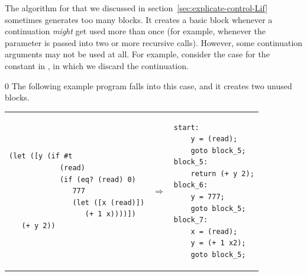 \documentclass[7x10]{TimesAPriori_MIT}%
\def\racketEd{0}
\def\edition{1}
\numberwithin{theorem}{chapter}
\numberwithin{definition}{chapter}
\numberwithin{equation}{chapter}
\begin{document}
The algorithm for  that we discussed in
section~\ref{sec:explicate-control-Lif} sometimes generates too many
blocks. It creates a basic block whenever a continuation \emph{might}
get used more than once (for example, whenever the  parameter is
passed into two or more recursive calls). However, some continuation
arguments may not be used at all. For example, consider the case for
the constant \TRUE{} in , in which we discard the
 continuation.
%
{\if\edition\racketEd
The following example program falls into this
case, and it creates two unused blocks.       
\begin{center}
\begin{tabular}{lll}
\begin{minipage}{0.4\textwidth}
\begin{lstlisting}
(let ([y (if #t
            (read)
            (if (eq? (read) 0)
               777
               (let ([x (read)])
                  (+ 1 x))))])
   (+ y 2))
\end{lstlisting}
\end{minipage}
&
$\Rightarrow$
&
\begin{minipage}{0.55\textwidth}
\begin{lstlisting}
start:
    y = (read);
    goto block_5;
block_5:
    return (+ y 2);
block_6:
    y = 777;
    goto block_5;
block_7:
    x = (read);
    y = (+ 1 x2);
    goto block_5;
\end{lstlisting}
\end{minipage}
\end{tabular} 
\end{center}
\fi}
\end{document}
